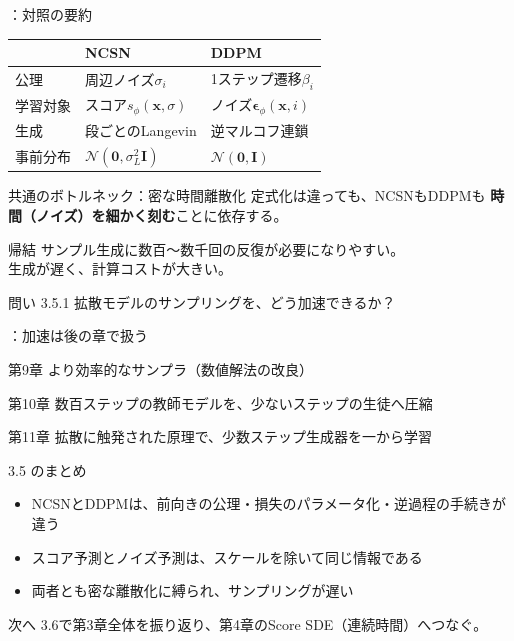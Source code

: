 \assuppl
\begin{frame}{\supplmark：対照の要約}
    \centering
    \footnotesize
    \renewcommand{\arraystretch}{1.3}
    \begin{tabular}{|l|p{}|p{}|}
        \hline
        & NCSN & DDPM \\
        \hline
        公理 & 周辺ノイズ$\sigma_i$ & 1ステップ遷移$\beta_i$ \\
        \hline
        学習対象 & スコア$s_\phi(\bm{x},\sigma)$ & ノイズ$\bm{\epsilon}_\phi(\bm{x},i)$ \\
        \hline
        生成 & 段ごとのLangevin & 逆マルコフ連鎖 \\
        \hline
        事前分布 & $\mathcal{N}(\bm{0},\sigma_L^{2}\bm{I})$ & $\mathcal{N}(\bm{0},\bm{I})$ \\
        \hline
    \end{tabular}
    \normalsize
\end{frame}
\asmain
\begin{frame}{共通のボトルネック：密な時間離散化}
    定式化は違っても、NCSNもDDPMも
    \textbf{時間（ノイズ）を細かく刻む}ことに依存する。
    \begin{block}{帰結}
        サンプル生成に数百〜数千回の反復が必要になりやすい。\\
        生成が遅く、計算コストが大きい。
    \end{block}
    \begin{alertblock}{問い 3.5.1}
        拡散モデルのサンプリングを、どう加速できるか？
    \end{alertblock}
\end{frame}
\assuppl
\begin{frame}{\supplmark：加速は後の章で扱う}
    \begin{exampleblock}{第9章}
        より効率的なサンプラ（数値解法の改良）
    \end{exampleblock}
    \begin{exampleblock}{第10章}
        数百ステップの教師モデルを、少ないステップの生徒へ圧縮
    \end{exampleblock}
    \begin{exampleblock}{第11章}
        拡散に触発された原理で、少数ステップ生成器を一から学習
    \end{exampleblock}
\end{frame}
\asmain
\begin{frame}{3.5 のまとめ}
    \begin{itemize}
        \item NCSNとDDPMは、前向きの公理・損失のパラメータ化・逆過程の手続きが違う
        \item スコア予測とノイズ予測は、スケールを除いて同じ情報である
        \item 両者とも密な離散化に縛られ、サンプリングが遅い
    \end{itemize}
    \begin{block}{次へ}
        3.6で第3章全体を振り返り、第4章のScore SDE（連続時間）へつなぐ。
    \end{block}
\end{frame}
